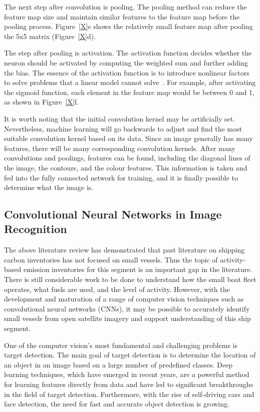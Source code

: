 The next step after convolution is pooling. The pooling method can reduce the feature map size and maintain similar features to the feature map before the pooling process. Figure~\ref{X}e shows the relatively small feature map after pooling the 5x5 matrix (Figure~\ref{X}d).


The step after pooling is activation. The activation function decides whether the neuron should be activated by computing the weighted sum and further adding the bias. The essence of the activation function is to introduce nonlinear factors to solve problems that a linear model cannot solve~\cite{lin2018research}. For example, after activating the sigmoid function, each element in the feature map would be between 0 and 1, as shown in Figure~\ref{X}f.

It is worth noting that the initial convolution kernel may be artificially set. Nevertheless, machine learning will go backwards to adjust and find the most suitable convolution kernel based on its data. Since an image generally has many features, there will be many corresponding convolution kernels. After many convolutions and poolings, features can be found, including the diagonal lines of the image, the contours, and the colour features. This information is taken and fed into the fully connected network for training, and it is finally possible to determine what the image is.


\subsection{Convolutional Neural Networks in Image Recognition}
\label{sec2.2}
The above literature review has demonstrated that past literature on shipping carbon inventories has not focused on small vessels. Thus the topic of activity-based emission inventories for this segment is an important gap in the literature. There is still considerable work to be done to understand how the small boat fleet operates, what fuels are used, and the level of activity. However, with the development and maturation of a range of computer vision techniques such as convolutional neural networks (CNNs), it may be possible to accurately identify small vessels from open satellite imagery and support understanding of this ship segment. 

One of the computer vision's most fundamental and challenging problems is target detection. The main goal of target detection is to determine the location of an object in an image based on a large number of predefined classes. Deep learning techniques, which have emerged in recent years, are a powerful method for learning features directly from data and have led to significant breakthroughs in the field of target detection. Furthermore, with the rise of self-driving cars and face detection, the need for fast and accurate object detection is growing.

